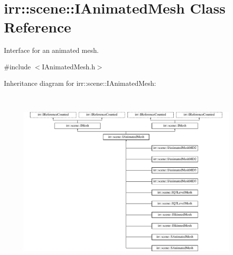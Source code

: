 \hypertarget{classirr_1_1scene_1_1IAnimatedMesh}{}\section{irr\+:\+:scene\+:\+:I\+Animated\+Mesh Class Reference}
\label{classirr_1_1scene_1_1IAnimatedMesh}


Interface for an animated mesh.  




{\ttfamily \#include $<$I\+Animated\+Mesh.\+h$>$}

Inheritance diagram for irr\+:\+:scene\+:\+:I\+Animated\+Mesh\+:\begin{figure}[H]
\begin{center}
\leavevmode
\includegraphics[height=9.479166cm]{classirr_1_1scene_1_1IAnimatedMesh}
\end{center}
\end{figure}
